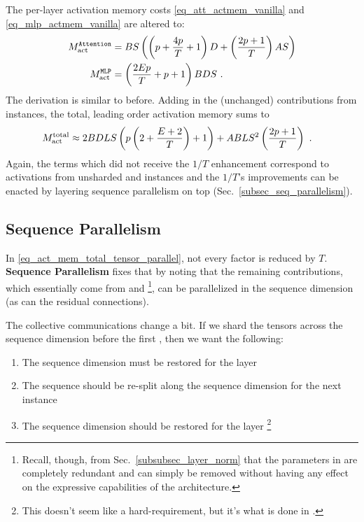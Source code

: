 \documentclass[11pt]{article}
\begin{document}
The per-layer activation memory costs \eqref{eq_att_actmem_vanilla} and
\eqref{eq_mlp_actmem_vanilla} are altered to:
\begin{align}
	M _{ \rm act  } ^\texttt{Attention} & = BS \left ( \left (p + \frac{ 4p }{ T }+1 \right )D + \left
		(\frac{ 2p+1 }{ T } \right )AS  \right ) \nonumber\\
	M _{ \rm act  } ^\texttt{MLP}       & = \left (\frac{ 2Ep }{ T }+p+1 \right )BDS\ .
	\label{eq_act_mem_attn_mlp}
\end{align}
The derivation is similar to before. Adding in the (unchanged) contributions from
 instances, the total, leading order activation memory sums to
\begin{align}
	M _{ {\rm act}  } ^{ {\rm  total}  } & \approx  2BDLS   \left ( p \left (2+ \frac{ E+2 }{ T }\right ) + 1   \right )
	+ ABLS ^{ 2 } \left ( \frac{ 2p+1 }{ T }\right ) \label{eq_act_mem_total_tensor_parallel}\ .
\end{align}
Again, the terms which did not receive the $ 1/T $ enhancement correspond to activations from
unsharded  and  instances and the $ 1/T $'s improvements can
be enacted by layering sequence parallelism on top (Sec.~\ref{subsec_seq_parallelism}).


\subsection{Sequence Parallelism \label{subsec_seq_parallelism}}

In \eqref{eq_act_mem_total_tensor_parallel}, not every factor is reduced by $ T $. \textbf{Sequence
	Parallelism} fixes that by noting that the remaining contributions, which essentially come from
 and \footnote{Recall, though, from
	Sec.~\ref{subsubsec_layer_norm} that the parameters in  are completely redundant
	and can simply be removed without having any effect on the expressive capabilities of the
	architecture.}, can be parallelized in the sequence dimension (as can the residual connections).

The collective communications change a bit. If we shard the tensors across the sequence dimension
before the first , then we want the following:
\begin{enumerate}
	\item The sequence dimension must be restored for the  layer
	\item The sequence should be re-split along the sequence dimension for the next  instance
	\item The sequence dimension should be restored for the  layer \footnote{This doesn't
		      seem like a hard-requirement, but it's what is done in \cite{korthikanti2022reducing}.}
\end{enumerate}
\end{document}
